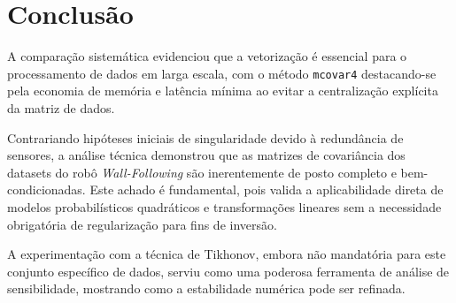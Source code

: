 \section{Conclusão}
\label{chap:conclusao}

A comparação sistemática evidenciou que a vetorização é essencial para o processamento de dados em larga escala, com o método \texttt{mcovar4} destacando-se pela economia de memória e latência mínima ao evitar a centralização explícita da matriz de dados.

Contrariando hipóteses iniciais de singularidade devido à redundância de sensores, a análise técnica demonstrou que as matrizes de covariância dos datasets do robô \textit{Wall-Following} são inerentemente de posto completo e bem-condicionadas. Este achado é fundamental, pois valida a aplicabilidade direta de modelos probabilísticos quadráticos e transformações lineares sem a necessidade obrigatória de regularização para fins de inversão.

A experimentação com a técnica de Tikhonov, embora não mandatória para este conjunto específico de dados, serviu como uma poderosa ferramenta de análise de sensibilidade, mostrando como a estabilidade numérica pode ser refinada.